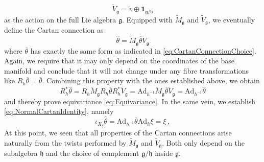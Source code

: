 \documentclass[11pt,a4paper]{article}
\numberwithin{equation}{section}
\newcommand{\commentO}[1]{ {\color{blue}  [{\bf O: #1}]}}
\begin{document}
\begin{equation}\label{eq:DefTildeVg}
  \widetilde{V}_{\mathfrak{g}} = \widetilde{v} \oplus \mathbf{1}_{\mathfrak{g}/\mathfrak{h}}
\end{equation}
as the action on the full Lie algebra $\mathfrak{g}$. Equipped with $\widetilde{M}_{\mathfrak{g}}$ and $\widetilde{V}_{\mathfrak{g}}$, we eventually define the Cartan connection as
\begin{equation}\label{eq:twistForCartan}
  \widehat{\theta} = \widetilde{M}_{\mathfrak{g}} \overline{\theta} \widetilde{V}_{\mathfrak{g}}
\end{equation}
where $\overline{\theta}$ has exactly the same form as indicated in \eqref{eq:CartanConnectionChoice}. Again, we require that it may only depend on the coordinates of the base manifold and conclude that it will not change under any fibre transformations like $R_h \overline{\theta} = \overline{\theta}$. Combining this property with the ones established above, we obtain
\begin{equation}\label{eq:EquivarianceExplicit}
  R^*_h \widehat{\theta} = R_h \widetilde{M}_{\mathfrak{g}} R_h \overline{\theta} R^*_h \widetilde{V}_{\mathfrak{g}} = \mathrm{Ad}_{h^{-1}} \widetilde M_{\mathfrak{g}} \overline{\theta} \widetilde{V}_{\mathfrak{g}} = \mathrm{Ad}_{h^{-1}} \widehat{\theta}
\end{equation}
and thereby prove equivariance \eqref{eq:Equivariance}. In the same vein, we establish \eqref{eq:NormalCartanIdentity}, namely
\begin{equation}\label{eq:CartanIdentityExplicit}
  \iota_{X_\xi} \widehat{\theta} = \mathrm{Ad}_{h^{-1}} \overline{\theta} \mathrm{Ad}_{h} \xi = \xi\,,
\end{equation}
At this point, we seen that all properties of the Cartan connections arise naturally from the twists performed by $\widetilde{M}_{\mathfrak{g}}$ and $\widetilde{V}_{\mathfrak{g}}$. Both only depend on the subalgebra $\mathfrak{h}$ and the choice of complement $\mathfrak{g}/\mathfrak{h}$ inside $\mathfrak{g}$.

\end{document}
